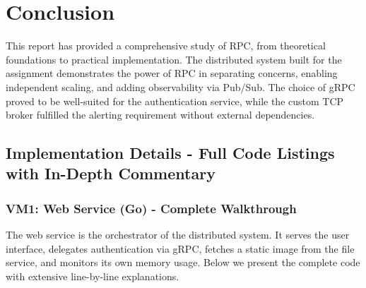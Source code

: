 \documentclass[a4paper]{article}
\begin{document}
\section{Conclusion}
This report has provided a comprehensive study of RPC, from theoretical foundations to practical implementation. The distributed system built for the assignment demonstrates the power of RPC in separating concerns, enabling independent scaling, and adding observability via Pub/Sub. The choice of gRPC proved to be well-suited for the authentication service, while the custom TCP broker fulfilled the alerting requirement without external dependencies.







































\subsection{Implementation Details - Full Code Listings with In-Depth Commentary}

\subsubsection{VM1: Web Service (Go) - Complete Walkthrough}
The web service is the orchestrator of the distributed system. It serves the user interface, delegates authentication via gRPC, fetches a static image from the file service, and monitors its own memory usage. Below we present the complete code with extensive line-by-line explanations.
\end{document}
